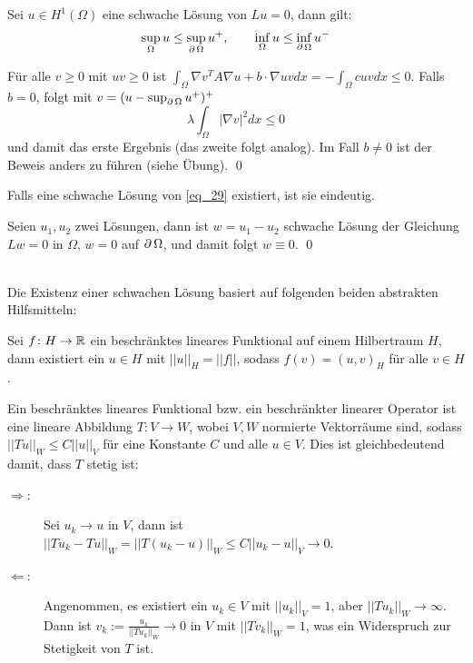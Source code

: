 \begin{defn} \label{thm_66}
	Sei $u \in H^1(\Omega)$ eine schwache Lösung von $Lu = 0$, dann gilt: \marginnote{[66]}
	\[ \sup_\Omega u \leq \sup_{\operatorname{\partial} \Omega} u^+, \qquad \inf_{\Omega} u \leq \inf_{\operatorname{\partial} \Omega} u^- \]
\end{defn}
	
	Für alle $v \geq 0$ mit $uv \geq 0$ ist $\int_{\Omega} \nabla v^T A \nabla u + b \cdot \nabla uv dx = -\int_{\Omega} cuvdx \leq 0$. Falls $b = 0$, folgt mit $v = (u - \sup_{\operatorname{\partial} \Omega} u^+)^+$
	\[ \lambda \int_{\Omega} |\nabla v|^2 dx \leq 0 \]
	und damit das erste Ergebnis (das zweite folgt analog). Im Fall $b \neq 0$ ist der Beweis anders zu führen (siehe Übung). \qed
	
\begin{defn} \label{thm_67}
	Falls eine schwache Lösung von \eqref{eq_29} existiert, ist sie eindeutig. \marginnote{[67]}
\end{defn}
	
	Seien $u_1,u_2$ zwei Lösungen, dann ist $w = u_1 -u_2$ schwache Lösung der Gleichung $Lw = 0$ in $\Omega$, $w= 0$ auf $\operatorname{\partial} \Omega$, und damit folgt $w \equiv 0$. \qed
	
\mbox{} \\
Die Existenz einer schwachen Lösung basiert auf folgenden beiden abstrakten Hilfsmitteln:

\begin{defn} \label{thm_68} \label{riesz}
	Sei $f\colon H \rightarrow \mathbb{R}$ \marginnote{[68]} ein beschränktes lineares Funktional auf einem Hilbertraum $H$, dann existiert ein $u \in H$ mit $||u||_H = ||f||$, sodass $f(v) = (u,v)_H$ für alle $v \in H$.
\end{defn}
	
\begin{bem} \label{bem_69}
	Ein beschränktes lineares Funktional bzw. ein beschränkter linearer Operator ist eine lineare Abbildung \marginnote{[69]} $T\colon V \rightarrow W$, wobei $V,W$ normierte Vektorräume sind, sodass $||Tu||_W \leq C ||u||_V$ für eine Konstante $C$ und alle $u \in V$. Dies ist gleichbedeutend damit, dass $T$ stetig ist:
	\begin{description}
		\item[\glqq$\Rightarrow$\grqq:] Sei $u_k \rightarrow u$ in $V$, dann ist $||Tu_k - Tu||_W = ||T(u_k - u)||_W \leq C ||u_k - u||_V \rightarrow 0$.
		\item[\glqq$\Leftarrow$\grqq:] Angenommen, es existiert ein $u_k \in V$ mit $||u_k||_V = 1$, aber $||Tu_k||_W \rightarrow \infty$. Dann ist $v_k := \frac{u_k}{||Tu_k||_W} \rightarrow 0$ in $V$ mit $||Tv_k||_W = 1$, was ein Widerspruch zur Stetigkeit von $T$ ist.
	\end{description}
\end{bem}
	
